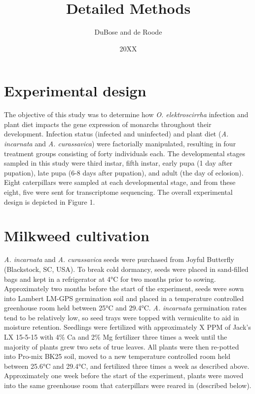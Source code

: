 \documentclass{article}
\title{Detailed Methods}
\author{DuBose and de Roode}
\date{20XX}
\begin{document}
\maketitle

\begin{multicols}{2}
    \section{Experimental design}
    \indent The objective of this study was to determine how \emph{O. elektroscirrha} infection and plant diet impacts the gene expression of 
    monarchs throughout their development. Infection status (infected and uninfected) and plant diet (\emph{A. incarnata} and \emph{A. curassavica}) 
    were factorially manipulated, resulting in four treatment groups consisting of forty individuals each. The developmental stages 
    sampled in this study were third instar, fifth instar, early pupa (1 day after pupation), late pupa (6-8 days after pupation), and 
    adult (the day of eclosion). Eight caterpillars were sampled at each developmental stage, and from these eight, five were sent for 
    transcriptome sequencing. The overall experimental design is depicted in Figure 1.

    \section{Milkweed cultivation}
    \indent \emph{A. incarnata} and \emph{A. curassavica} seeds were purchased from Joyful Butterfly (Blackstock, SC, USA). To break 
    cold dormancy, seeds were placed in sand-filled bags and kept in a refrigerator at 4°C for two months prior to sowing. Approximately two 
    months before the start of the experiment, seeds were sown into Lambert LM-GPS germination soil and placed in a temperature controlled 
    greenhouse room held between 25°C and 29.4°C. \emph{A. incarnata} germination rates tend to be relatively low, so seed trays were topped with 
    vermiculite to aid in moisture retention. Seedlings were fertilized with approximately X PPM of Jack’s LX 15-5-15 with 4\% Ca and 2\% 
    Mg fertilizer three times a week until the majority of plants grew two sets of true leaves. All plants were then re-potted into Pro-mix 
    BK25 soil, moved to a new temperature controlled room held between 25.6°C and 29.4°C, and fertilized three times a week as described above. 
    Approximately one week before the start of the experiment, plants were moved into the same greenhouse room that caterpillars were reared in 
    (described below).


\end{multicols}
\end{document}
